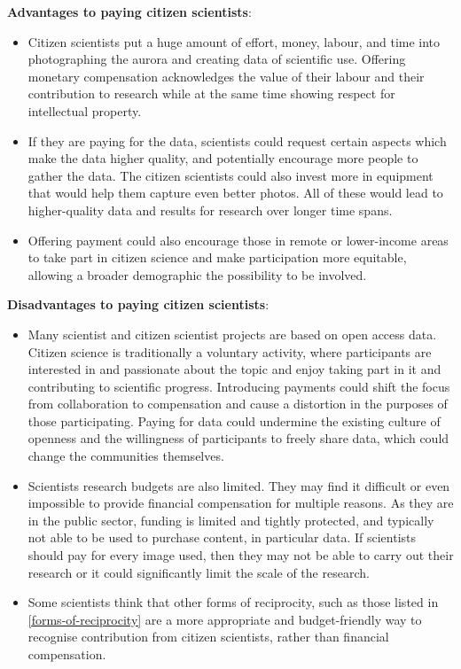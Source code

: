 \documentclass{article}
\begin{document}
\textbf{Advantages to paying citizen scientists}:
\begin{itemize}
    \item Citizen scientists put a huge amount of effort, money, labour, and time into photographing the aurora and creating data of scientific use. Offering monetary compensation acknowledges the value of their labour and their contribution to research while at the same time showing respect for intellectual property.
    \item If they are paying for the data, scientists could request certain aspects which make the data higher quality, and potentially encourage more people to gather the data. The citizen scientists could also invest more in equipment that would help them capture even better photos. All of these would lead to higher-quality data and results for research over longer time spans.
    \item Offering payment could also encourage those in remote or lower-income areas to take part in citizen science and make participation more equitable, allowing a broader demographic the possibility to be involved.
\end{itemize}

\textbf{Disadvantages to paying citizen scientists}:
\begin{itemize}
    \item Many scientist and citizen scientist projects are based on open access data. Citizen science is traditionally a voluntary activity, where participants are interested in and passionate about the topic and enjoy taking part in it and contributing to scientific progress. Introducing payments could shift the focus from collaboration to compensation and cause a distortion in the purposes of those participating. Paying for data could undermine the existing culture of openness and the willingness of participants to freely share data, which could change the communities themselves.
    \item Scientists research budgets are also limited. They may find it difficult or even impossible to provide financial compensation for multiple reasons. As they are in the public sector, funding is limited and tightly protected, and typically not able to be used to purchase content, in particular data. If scientists should pay for every image used, then they may not be able to carry out their research or it could significantly limit the scale of the research.
    \item Some scientists think that other forms of reciprocity, such as those listed in \ref{forms-of-reciprocity} are a more appropriate and budget-friendly way to recognise contribution from citizen scientists, rather than financial compensation.
\end{itemize}
\end{document}
